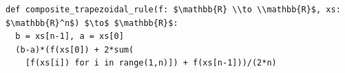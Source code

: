 \documentclass[border=10pt]{standalone}
\begin{document}
\begin{lstlisting}
def composite_trapezoidal_rule(f: $\mathbb{R} \\to \\mathbb{R}$, xs: $\mathbb{R}^n$) $\to$ $\mathbb{R}$:
  b = xs[n-1], a = xs[0]
  (b-a)*(f(xs[0]) + 2*sum(
    [f(xs[i]) for i in range(1,n)]) + f(xs[n-1]))/(2*n)
\end{lstlisting}
\end{document}
